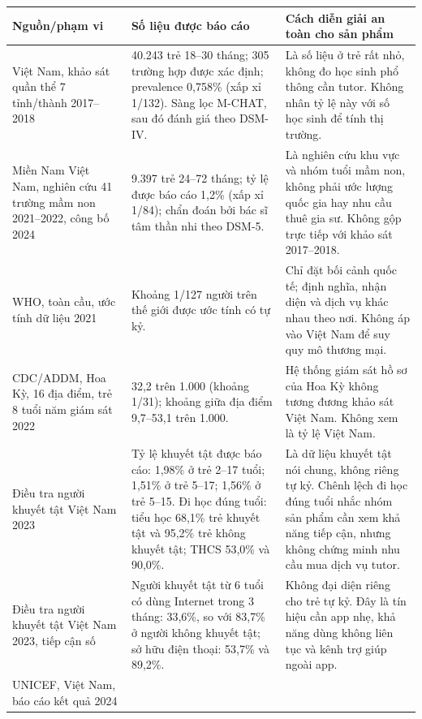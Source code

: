 \documentclass[11pt,a4paper]{article}
\begin{document}
\begin{longtable}{p{3.0cm}p{5.4cm}p{6.3cm}}
\toprule
\textbf{Nguồn/phạm vi} & \textbf{Số liệu được báo cáo} & \textbf{Cách diễn giải an toàn cho sản phẩm} \\
\midrule
\endhead
Việt Nam, khảo sát quần thể 7 tỉnh/thành 2017--2018 \cite{vui2022} &
40.243 trẻ 18--30 tháng; 305 trường hợp được xác định; prevalence 0,758\% (xấp xỉ 1/132). Sàng lọc M-CHAT, sau đó đánh giá theo DSM-IV. &
Là số liệu ở trẻ rất nhỏ, không đo học sinh phổ thông cần tutor. Không nhân tỷ lệ này với số học sinh để tính thị trường. \\
\addlinespace
Miền Nam Việt Nam, nghiên cứu 41 trường mầm non 2021--2022, công bố 2024 \cite{tran2024} &
9.397 trẻ 24--72 tháng; tỷ lệ được báo cáo 1,2\% (xấp xỉ 1/84); chẩn đoán bởi bác sĩ tâm thần nhi theo DSM-5. &
Là nghiên cứu khu vực và nhóm tuổi mầm non, không phải ước lượng quốc gia hay nhu cầu thuê gia sư. Không gộp trực tiếp với khảo sát 2017--2018. \\
\addlinespace
WHO, toàn cầu, ước tính dữ liệu 2021 \cite{who2025} &
Khoảng 1/127 người trên thế giới được ước tính có tự kỷ. &
Chỉ đặt bối cảnh quốc tế; định nghĩa, nhận diện và dịch vụ khác nhau theo nơi. Không áp vào Việt Nam để suy quy mô thương mại. \\
\addlinespace
CDC/ADDM, Hoa Kỳ, 16 địa điểm, trẻ 8 tuổi năm giám sát 2022 \cite{cdc2025} &
32,2 trên 1.000 (khoảng 1/31); khoảng giữa địa điểm 9,7--53,1 trên 1.000. &
Hệ thống giám sát hồ sơ của Hoa Kỳ không tương đương khảo sát Việt Nam. Không xem là tỷ lệ Việt Nam. \\
\addlinespace
Điều tra người khuyết tật Việt Nam 2023 \cite{gso2023} &
Tỷ lệ khuyết tật được báo cáo: 1,98\% ở trẻ 2--17 tuổi; 1,51\% ở trẻ 5--17; 1,56\% ở trẻ 5--15. Đi học đúng tuổi: tiểu học 68,1\% trẻ khuyết tật và 95,2\% trẻ không khuyết tật; THCS 53,0\% và 90,0\%. &
Là dữ liệu khuyết tật nói chung, không riêng tự kỷ. Chênh lệch đi học đúng tuổi nhắc nhóm sản phẩm cần xem khả năng tiếp cận, nhưng không chứng minh nhu cầu mua dịch vụ tutor. \\
\addlinespace
Điều tra người khuyết tật Việt Nam 2023, tiếp cận số \cite{gso2023} &
Người khuyết tật từ 6 tuổi có dùng Internet trong 3 tháng: 33,6\%, so với 83,7\% ở người không khuyết tật; sở hữu điện thoại: 53,7\% và 89,2\%. &
Không đại diện riêng cho trẻ tự kỷ. Đây là tín hiệu cần app nhẹ, khả năng dùng không liên tục và kênh trợ giúp ngoài app. \\
\addlinespace
UNICEF, Việt Nam, báo cáo kết quả 2024 \cite{unicef2025inclusive} &

\end{longtable}
\end{document}
